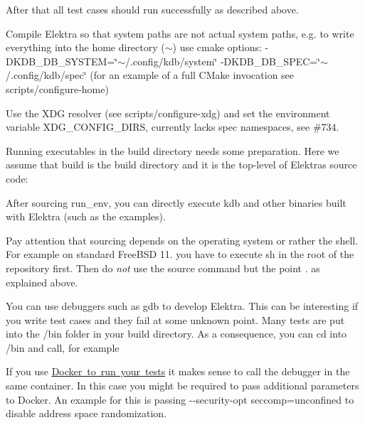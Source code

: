 \begin{DoxyEnumerate}
After that all test cases should run successfully as described above.
\item Compile Elektra so that system paths are not actual system paths, e.\+g. to write everything into the home directory ({\ttfamily $\sim$}) use cmake options\+: {\ttfamily -\/D\+K\+D\+B\+\_\+\+D\+B\+\_\+\+S\+Y\+S\+T\+EM=\char`\"{}$\sim$/.\+config/kdb/system\char`\"{} -\/D\+K\+D\+B\+\_\+\+D\+B\+\_\+\+S\+P\+EC=\char`\"{}$\sim$/.\+config/kdb/spec\char`\"{}} (for an example of a full C\+Make invocation see {\ttfamily scripts/configure-\/home})
\item Use the X\+DG resolver (see {\ttfamily scripts/configure-\/xdg}) and set the environment variable {\ttfamily X\+D\+G\+\_\+\+C\+O\+N\+F\+I\+G\+\_\+\+D\+I\+RS}, currently lacks {\ttfamily spec} namespaces, see \#734.
\end{DoxyEnumerate}

Running executables in the build directory needs some preparation. Here we assume that {\ttfamily build} is the build directory and it is the top-\/level of Elektra\textquotesingle{}s source code\+:


\begin{DoxyCode}{0}
\end{DoxyCode}


After sourcing {\ttfamily run\+\_\+env}, you can directly execute {\ttfamily kdb} and other binaries built with Elektra (such as the examples).

Pay attention that sourcing depends on the operating system or rather the shell. For example on standard Free\+B\+SD 11. you have to execute {\ttfamily sh} in the root of the repository first. Then do {\itshape not} use the {\ttfamily source} command but the point {\ttfamily .} as explained above.

You can use debuggers such as {\ttfamily gdb} to develop Elektra. This can be interesting if you write test cases and they fail at some unknown point. Many tests are put into the {\ttfamily /bin} folder in your build directory. As a consequence, you can {\ttfamily cd} into {\ttfamily /bin} and call, for example


\begin{DoxyCode}{0}
\end{DoxyCode}


If you use \mbox{\hyperlink{doc_tutorials_run_all_tests_with_docker_md}{Docker to run your tests}} it makes sense to call the debugger in the same container. In this case you might be required to pass additional parameters to Docker. An example for this is passing {\ttfamily -\/-\/security-\/opt seccomp=unconfined} to disable address space randomization.

